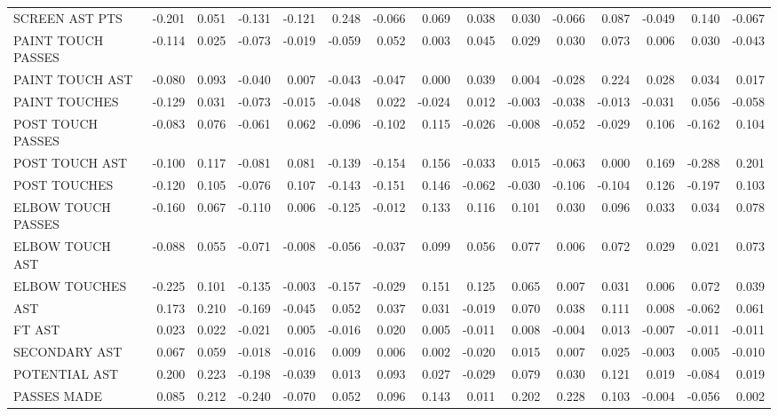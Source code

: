 \begin{tabular}{lrrrrrrrrrrrrrr}
SCREEN AST PTS & -0.201 & 0.051 & -0.131 & -0.121 & 0.248 & -0.066 & 0.069 & 0.038 & 0.030 & -0.066 & 0.087 & -0.049 & 0.140 & -0.067 \\
PAINT TOUCH PASSES & -0.114 & 0.025 & -0.073 & -0.019 & -0.059 & 0.052 & 0.003 & 0.045 & 0.029 & 0.030 & 0.073 & 0.006 & 0.030 & -0.043 \\
PAINT TOUCH AST & -0.080 & 0.093 & -0.040 & 0.007 & -0.043 & -0.047 & 0.000 & 0.039 & 0.004 & -0.028 & 0.224 & 0.028 & 0.034 & 0.017 \\
PAINT TOUCHES & -0.129 & 0.031 & -0.073 & -0.015 & -0.048 & 0.022 & -0.024 & 0.012 & -0.003 & -0.038 & -0.013 & -0.031 & 0.056 & -0.058 \\
POST TOUCH PASSES & -0.083 & 0.076 & -0.061 & 0.062 & -0.096 & -0.102 & 0.115 & -0.026 & -0.008 & -0.052 & -0.029 & 0.106 & -0.162 & 0.104 \\
POST TOUCH AST & -0.100 & 0.117 & -0.081 & 0.081 & -0.139 & -0.154 & 0.156 & -0.033 & 0.015 & -0.063 & 0.000 & 0.169 & -0.288 & 0.201 \\
POST TOUCHES & -0.120 & 0.105 & -0.076 & 0.107 & -0.143 & -0.151 & 0.146 & -0.062 & -0.030 & -0.106 & -0.104 & 0.126 & -0.197 & 0.103 \\
ELBOW TOUCH PASSES & -0.160 & 0.067 & -0.110 & 0.006 & -0.125 & -0.012 & 0.133 & 0.116 & 0.101 & 0.030 & 0.096 & 0.033 & 0.034 & 0.078 \\
ELBOW TOUCH AST & -0.088 & 0.055 & -0.071 & -0.008 & -0.056 & -0.037 & 0.099 & 0.056 & 0.077 & 0.006 & 0.072 & 0.029 & 0.021 & 0.073 \\
ELBOW TOUCHES & -0.225 & 0.101 & -0.135 & -0.003 & -0.157 & -0.029 & 0.151 & 0.125 & 0.065 & 0.007 & 0.031 & 0.006 & 0.072 & 0.039 \\
AST & 0.173 & 0.210 & -0.169 & -0.045 & 0.052 & 0.037 & 0.031 & -0.019 & 0.070 & 0.038 & 0.111 & 0.008 & -0.062 & 0.061 \\
FT AST & 0.023 & 0.022 & -0.021 & 0.005 & -0.016 & 0.020 & 0.005 & -0.011 & 0.008 & -0.004 & 0.013 & -0.007 & -0.011 & -0.011 \\
SECONDARY AST & 0.067 & 0.059 & -0.018 & -0.016 & 0.009 & 0.006 & 0.002 & -0.020 & 0.015 & 0.007 & 0.025 & -0.003 & 0.005 & -0.010 \\
POTENTIAL AST & 0.200 & 0.223 & -0.198 & -0.039 & 0.013 & 0.093 & 0.027 & -0.029 & 0.079 & 0.030 & 0.121 & 0.019 & -0.084 & 0.019 \\
PASSES MADE & 0.085 & 0.212 & -0.240 & -0.070 & 0.052 & 0.096 & 0.143 & 0.011 & 0.202 & 0.228 & 0.103 & -0.004 & -0.056 & 0.002 \\

\end{tabular}
